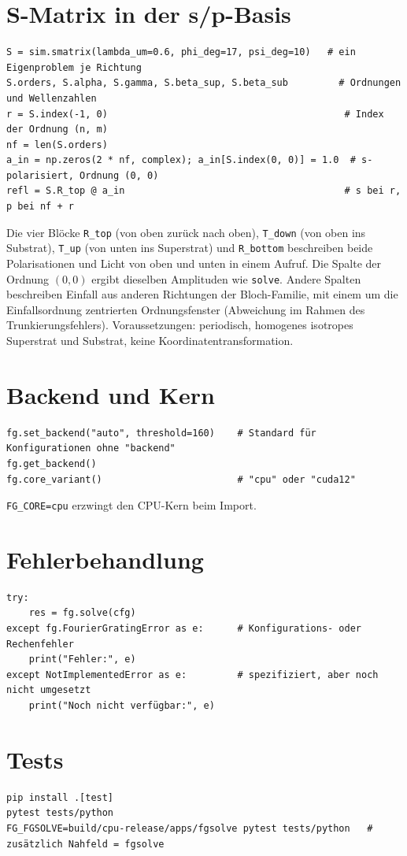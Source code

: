 \section{S-Matrix in der s/p-Basis}\label{sec:smatrix}
%
\begin{lstlisting}[style=py]
S = sim.smatrix(lambda_um=0.6, phi_deg=17, psi_deg=10)   # ein Eigenproblem je Richtung
S.orders, S.alpha, S.gamma, S.beta_sup, S.beta_sub         # Ordnungen und Wellenzahlen
r = S.index(-1, 0)                                          # Index der Ordnung (n, m)
nf = len(S.orders)
a_in = np.zeros(2 * nf, complex); a_in[S.index(0, 0)] = 1.0  # s-polarisiert, Ordnung (0, 0)
refl = S.R_top @ a_in                                       # s bei r, p bei nf + r
\end{lstlisting}
Die vier Blöcke \texttt{R\_top} (von oben zurück nach oben), \texttt{T\_down} (von oben ins Substrat),
\texttt{T\_up} (von unten ins Superstrat) und \texttt{R\_bottom} beschreiben beide Polarisationen und Licht von
oben und unten in einem Aufruf. Die Spalte der Ordnung $(0,0)$ ergibt dieselben Amplituden wie \texttt{solve}.
Andere Spalten beschreiben Einfall aus anderen Richtungen der Bloch-Familie, mit einem um die Einfallsordnung
zentrierten Ordnungsfenster (Abweichung im Rahmen des Trunkierungsfehlers). Voraussetzungen: periodisch,
homogenes isotropes Superstrat und Substrat, keine Koordinatentransformation.

\section{Backend und Kern}
\begin{lstlisting}[style=py]
fg.set_backend("auto", threshold=160)    # Standard für Konfigurationen ohne "backend"
fg.get_backend()
fg.core_variant()                        # "cpu" oder "cuda12"
\end{lstlisting}
\texttt{FG\_CORE=cpu} erzwingt den CPU-Kern beim Import.

\section{Fehlerbehandlung}
%
\begin{lstlisting}[style=py]
try:
    res = fg.solve(cfg)
except fg.FourierGratingError as e:      # Konfigurations- oder Rechenfehler
    print("Fehler:", e)
except NotImplementedError as e:         # spezifiziert, aber noch nicht umgesetzt
    print("Noch nicht verfügbar:", e)
\end{lstlisting}

\section{Tests}
\begin{lstlisting}[style=shell]
pip install .[test]
pytest tests/python
FG_FGSOLVE=build/cpu-release/apps/fgsolve pytest tests/python   # zusätzlich Nahfeld = fgsolve
\end{lstlisting}
